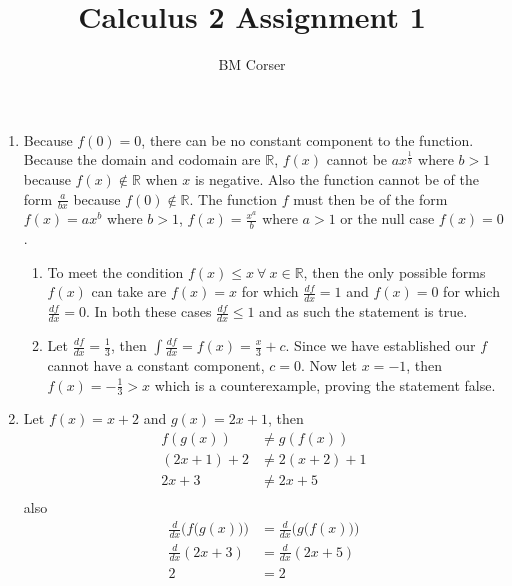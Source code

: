 \documentclass[10pt]{article}
\author{BM Corser}
\title{Calculus 2 Assignment 1}
\date{}
\begin{document}
    \maketitle 
    \begin{enumerate}
        \item Because $f(0) = 0$, there can be no constant component to the
            function. Because the domain and codomain are $\mathbb{R}$, $f(x)$
            cannot be $ax^{\tfrac{1}{b}}$ where $b > 1$ because $f(x) \notin
            \mathbb{R}$ when $x$ is negative. Also the function cannot be of
            the form $\frac{a}{bx}$ because $f(0) \notin \mathbb{R}$. The
            function $f$ must then be of the form $f(x) = ax^b$ where $b > 1$,
            $f(x) = \frac{x^a}{b}$ where $a > 1$ or the null case $f(x) = 0$.
        \begin{enumerate}
            \item To meet the condition $f(x) \leq x \ \forall \ x \in
                \mathbb{R}$, then the only possible forms $f(x)$ can take are
                $f(x) = x$ for which $\frac{df}{dx} = 1$ and $f(x) = 0$ for
                which $\frac{df}{dx} = 0$. In both these cases $\frac{df}{dx}
                \leq 1$ and as such the statement is true.
            \item Let $\frac{df}{dx} = \frac{1}{3}$, then
                $\int\frac{df}{dx} = f(x) = \frac{x}{3} + c$. Since we have
                established our $f$ cannot have a constant component, $c = 0$.
                Now let $x = -1$, then $f(x) = -\frac{1}{3} > x$ which is a
                counterexample, proving the statement false.
        \end{enumerate}
    \item Let $f(x) = x + 2$ and $g(x) = 2x + 1$, then
        \begin{align*}
            f(g(x)) &\neq g(f(x)) \\
            (2x + 1) + 2 &\neq 2(x + 2) + 1 \\
            2x + 3 &\neq 2x + 5 \\
        \end{align*}
        also
        \begin{align*}
            \frac{d}{dx}\Big(f\big(g(x)\big)\Big) &= \frac{d}{dx}\Big(g\big(f(x)\big)\Big) \\
            \frac{d}{dx}(2x + 3) &= \frac{d}{dx}(2x + 5) \\
            2 &= 2 \\
        \end{align*}

\end{enumerate}
\end{document}
